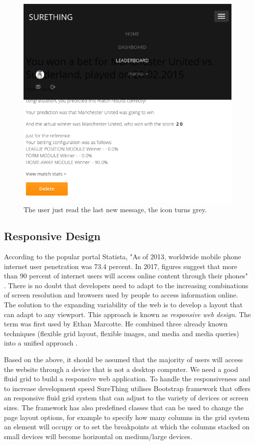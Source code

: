 \begin{figure}[H]
	\begin{center}
		\includegraphics[width=.60\textwidth]{impl/images/noMoreNewMessages}
		\caption{The user just read the last new message, the icon turns grey.} 
		\label{fig:nomorenewmessages}
	\end{center}
\end{figure}

\subsection{Responsive Design}
According to the popular portal Statista, "As of 2013, worldwide mobile phone internet user penetration was 73.4 percent. In 2017, figures suggest that more than 90 percent of internet users will access online content through their phones" \citep{statistaReport}. There is no doubt that developers need to adapt to the increasing combinations of screen resolution and browsers used by people to access information online. The solution to the expanding variability of the web is to develop a layout that can adapt to any viewport. This approach is known as \emph{responsive web design}. The term was first used by Ethan Marcotte. He combined three already known techniques (flexible grid layout, flexible images, and media and media queries) into a unified approach \citep{book:frain2012responsive}.

Based on the above, it should be assumed that the majority of users will access the website through a device that is not a desktop computer. We need a good fluid grid to build a responsive web application. To handle the responsiveness and to increase development speed SureThing utilises Bootstrap framework \citep{documentation:Bootstrap3} that offers an responsive fluid grid system that can adjust to the variety of devices or screen sizes. The framework has also predefined classes that can be used to change the page layout options, for example to specify how many columns in the grid system an element will occupy or to set the breakpoints at which the columns stacked on small devices will become horizontal on medium/large devices.

